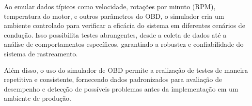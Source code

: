 Ao emular dados típicos como velocidade, rotações por minuto (RPM), temperatura do motor, e outros parâmetros do OBD, o simulador cria um ambiente controlado para verificar a eficácia do sistema em diferentes cenários de condução. Isso possibilita testes abrangentes, desde a coleta de dados até a análise de comportamentos específicos, garantindo a robustez e confiabilidade do sistema de rastreamento.

Além disso, o uso do simulador de OBD permite a realização de testes de maneira repetitiva e consistente, fornecendo dados padronizados para avaliação de desempenho e detecção de possíveis problemas antes da implementação em um ambiente de produção. 
